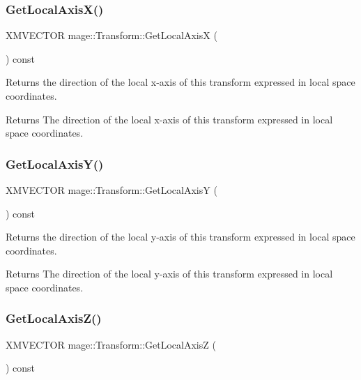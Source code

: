 \subsubsection{\texorpdfstring{Get\+Local\+Axis\+X()}{GetLocalAxisX()}}
{\footnotesize\ttfamily X\+M\+V\+E\+C\+T\+OR mage\+::\+Transform\+::\+Get\+Local\+AxisX (\begin{DoxyParamCaption}{ }\end{DoxyParamCaption}) const}

Returns the direction of the local x-\/axis of this transform expressed in local space coordinates.

\begin{DoxyReturn}{Returns}
The direction of the local x-\/axis of this transform expressed in local space coordinates. 
\end{DoxyReturn}
\hypertarget{structmage_1_1_transform_a101b2b97c9c94ce534e45e5bebafbebe}{}\label{structmage_1_1_transform_a101b2b97c9c94ce534e45e5bebafbebe} 
\subsubsection{\texorpdfstring{Get\+Local\+Axis\+Y()}{GetLocalAxisY()}}
{\footnotesize\ttfamily X\+M\+V\+E\+C\+T\+OR mage\+::\+Transform\+::\+Get\+Local\+AxisY (\begin{DoxyParamCaption}{ }\end{DoxyParamCaption}) const}

Returns the direction of the local y-\/axis of this transform expressed in local space coordinates.

\begin{DoxyReturn}{Returns}
The direction of the local y-\/axis of this transform expressed in local space coordinates. 
\end{DoxyReturn}
\hypertarget{structmage_1_1_transform_a426ae69a8a597413bd2772826cc2f21e}{}\label{structmage_1_1_transform_a426ae69a8a597413bd2772826cc2f21e} 
\subsubsection{\texorpdfstring{Get\+Local\+Axis\+Z()}{GetLocalAxisZ()}}
{\footnotesize\ttfamily X\+M\+V\+E\+C\+T\+OR mage\+::\+Transform\+::\+Get\+Local\+AxisZ (\begin{DoxyParamCaption}{ }\end{DoxyParamCaption}) const}

